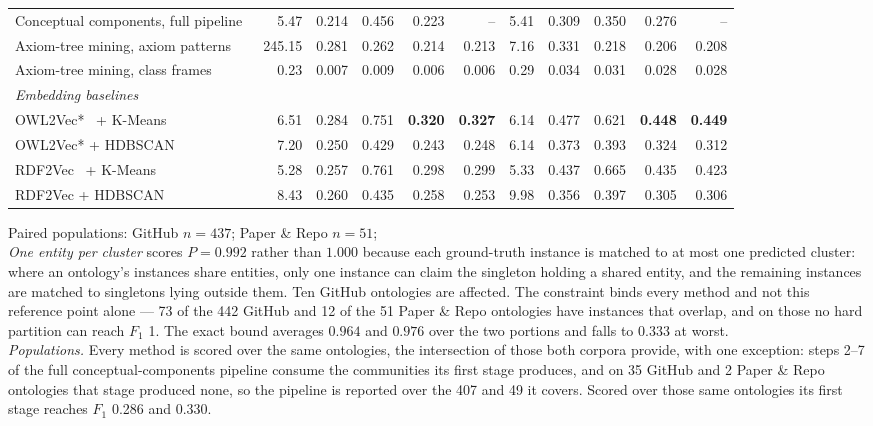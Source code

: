 \begin{table}[t]
\begin{tabular}{l|rrrr|r|rrrr|r}
Conceptual components, full pipeline~\cite{10.1145/3460210.3493542_extraction} & 5.47 & 0.214 & 0.456 & 0.223 & -- & 5.41 & 0.309 & 0.350 & 0.276 & -- \\
Axiom-tree mining, axiom patterns~\cite{doi:10.3233/SW-170280_extraction} & 245.15 & 0.281 & 0.262 & 0.214 & 0.213 & 7.16 & 0.331 & 0.218 & 0.206 & 0.208 \\
Axiom-tree mining, class frames~\cite{doi:10.3233/SW-170280_extraction} & 0.23 & 0.007 & 0.009 & 0.006 & 0.006 & 0.29 & 0.034 & 0.031 & 0.028 & 0.028 \\
\multicolumn{11}{l}{\textit{Embedding baselines}} \\
OWL2Vec*~\cite{chen2021owl2vec} + K-Means & 6.51 & 0.284 & 0.751 & \textbf{0.320} & \textbf{0.327} & 6.14 & 0.477 & 0.621 & \textbf{0.448} & \textbf{0.449} \\
OWL2Vec* + HDBSCAN & 7.20 & 0.250 & 0.429 & 0.243 & 0.248 & 6.14 & 0.373 & 0.393 & 0.324 & 0.312 \\
RDF2Vec~\cite{ristoski2016rdf2vec} + K-Means & 5.28 & 0.257 & 0.761 & 0.298 & 0.299 & 5.33 & 0.437 & 0.665 & 0.435 & 0.423 \\
RDF2Vec + HDBSCAN & 8.43 & 0.260 & 0.435 & 0.258 & 0.253 & 9.98 & 0.356 & 0.397 & 0.305 & 0.306 \\
\bottomrule
\end{tabular}
\begin{flushleft}\footnotesize Paired populations: GitHub $n=437$; Paper \& Repo $n=51$;\\
\emph{One entity per cluster} scores $P=0.992$ rather than $1.000$ because each ground-truth instance is matched to at most one predicted cluster: where an ontology's instances share entities, only one instance can claim the singleton holding a shared entity, and the remaining instances are matched to singletons lying outside them. Ten GitHub ontologies are affected. The constraint binds every method and not this reference point alone --- 73 of the 442 GitHub and 12 of the 51 Paper \& Repo ontologies have instances that overlap, and on those no hard partition can reach $F_1$ 1. The exact bound averages $0.964$ and $0.976$ over the two portions and falls to $0.333$ at worst.\\
\emph{Populations.} Every method is scored over the same ontologies, the intersection of those both corpora provide, with one exception: steps 2--7 of the full conceptual-components pipeline consume the communities its first stage produces, and on 35 GitHub and 2 Paper \& Repo ontologies that stage produced none, so the pipeline is reported over the 407 and 49 it covers. Scored over those same ontologies its first stage reaches $F_1$ 0.286 and 0.330.\end{flushleft}
\end{table}
